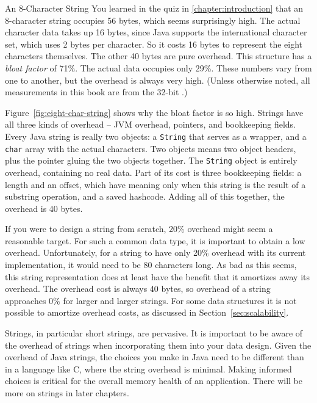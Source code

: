 \begin{example}{An 8-Character String}
 You learned in the quiz in \autoref{chapter:introduction} that an 8-character
 string occupies 56 bytes, which seems surprisingly high. The actual character data takes up 16
 bytes, since Java supports the international character set, which uses 2 bytes
 per character. So it costs 16 bytes to represent the eight characters
 themselves. The other 40 bytes are pure overhead. This structure has a
 \emph{bloat factor} of 71\%. The actual data occupies only 29\%. These numbers
 vary from one \jre to another, but the overhead is always very high. (Unless
 otherwise noted, all measurements in this book are from the 32-bit \oracle
 \javasix \jre.)

Figure~\ref{fig:eight-char-string} shows why the bloat factor is so high.
Strings have all three kinds of overhead -- JVM overhead, pointers, and
bookkeeping fields. Every Java string is really two objects: a {\tt String} that
serves as a wrapper, and a {\tt char} array with the actual characters. Two
objects means two object headers, plus the pointer gluing the two objects
together. The {\tt String} object is entirely overhead, containing no real data.
Part of its cost is three bookkeeping fields: a length and an offset, which have
meaning only when this string is the result of a substring operation, and a
saved hashcode. Adding all of this together, the overhead is 40 bytes.
\end{example}

If you were to design a string from scratch, 20\% overhead might seem a
reasonable target. For such a common data type, it is important to obtain a low
overhead.
Unfortunately, for a string to have only 20\% overhead with its current
implementation, it would need to be 80 characters long. As bad as this seems,
this string representation does at least have the benefit that it amortizes away
its overhead. The overhead cost is always 40 bytes, so overhead of a string
approaches 0\% for larger and larger strings.  For some data structures it is
not possible to amortize overhead costs, as discussed in
Section~\ref{sec:scalability}.

Strings, in particular short strings, are pervasive. It is important to be aware
of the overhead of strings when incorporating them into your data design. Given
the overhead of Java strings, the choices you make in Java need to be different
than in a language like C, where the string overhead is minimal. Making informed
choices is critical for the overall memory health of an application. There will
be more on strings in later chapters.


